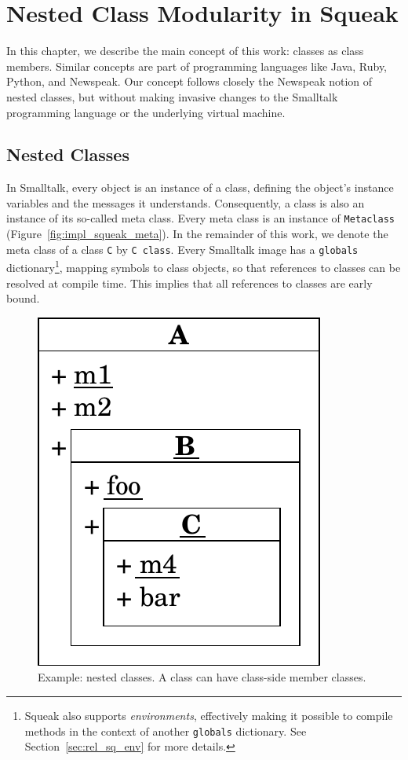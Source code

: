 \chapter{Nested Class Modularity in Squeak}
\label{sec:concept}
In this chapter, we describe the main concept of this work: classes as class members. Similar concepts are part of programming languages like Java, Ruby, Python, and Newspeak. Our concept follows closely the Newspeak notion of nested classes, but without making invasive changes to the Smalltalk programming language or the underlying virtual machine.

\section{Nested Classes}
In Smalltalk, every object is an instance of a class, defining the object's instance variables and the messages it understands. Consequently, a class is also an instance of its so-called meta class. Every meta class is an instance of \texttt{Metaclass} (Figure~\ref{fig:impl_squeak_meta}). In the remainder of this work, we denote the meta class of a class \texttt{C} by \texttt{C class}. Every Smalltalk image has a \texttt{globals} dictionary\footnote{Squeak also supports \emph{environments}, effectively making it possible to compile methods in the context of another \texttt{globals} dictionary. See Section~\ref{sec:rel_sq_env} for more details.}, mapping symbols to class objects, so that references to classes can be resolved at compile time. This implies that all references to classes are early bound.

\begin{figure}
	\includegraphics[scale=0.75]{nested_notation.pdf}
	\centering
	\caption[Example: Nested classes]{Example: nested classes. A class can have class-side member classes.}
	\label{fig:concept_nested_notation}
\end{figure}

